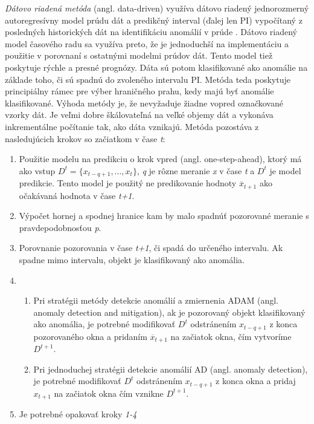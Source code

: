 \textit{Dátovo riadená metóda} (angl. data-driven) využíva dátovo riadený jednorozmerný autoregresívny model prúdu dát a predikčný interval (ďalej len PI) vypočítaný z posledných historických dát na identifikáciu anomálií v prúde \citep{hill2010anomaly}. Dátovo riadený model časového radu sa využíva preto, že je jednoduchší na implementáciu a použitie v porovnaní s ostatnými modelmi prúdov dát. Tento model tiež poskytuje rýchle a presné prognózy. Dáta sú potom klasifikované ako anomálie na základe toho, či sú spadnú do zvoleného intervalu PI. Metóda teda poskytuje principiálny rámec pre výber hraničného prahu, kedy majú byť anomálie klasifikované. Výhoda metódy je, že nevyžaduje žiadne vopred označkované vzorky dát. Je veľmi dobre škálovateľná na veľké objemy dát a vykonáva inkrementálne počítanie tak, ako dáta vznikajú.
Metóda pozostáva z nasledujúcich krokov so začiatkom v čase \textit{t}:
\begin{enumerate}
	\item Použitie modelu na predikciu o krok vpred (angl. one-step-ahead), ktorý má ako vstup $\displaystyle D^t = \{x_{t-q+1}, ..., x_t\}$, \textit{q} je rôzne meranie \textit{x} v čase \textit{t} a $\displaystyle D^t$ je model predikcie. Tento model je použitý ne predikovanie hodnoty $\displaystyle \overline{x}_{t+1}$ ako očakávaná hodnota v čase \textit{t+1}.
	\item Výpočet hornej a spodnej hranice kam by malo spadnúť pozorované meranie s pravdepodobnosťou \textit{p}.
	\item Porovnanie pozorovania v čase \textit{t+1}, či spadá do určeného intervalu. Ak spadne mimo intervalu, objekt je klasifikovaný ako anomália.
	\item 
		\begin{enumerate}
			\item Pri stratégii metódy detekcie anomálií a zmiernenia ADAM (angl. anomaly detection and mitigation), ak je pozorovaný objekt klasifikovaný ako anomália, je potrebné modifikovať $\displaystyle D^t$ odstránením $\displaystyle x_{t-q+1}$ z konca pozorovaného okna a pridaním $\displaystyle \overline{x}_{t+1}$ na začiatok okna, čím vytvoríme $\displaystyle D^{t+1}$.
			\item Pri jednoduchej stratégii detekcie anomálií AD (angl. anomaly detection), je potrebné modifikovať $\displaystyle D^t$  odstránením $\displaystyle x_{t-q+1}$ z konca okna a pridaj $\displaystyle x_{t+1}$ na začiatok okna čím vznikne $\displaystyle D^{t+1}$.
		\end{enumerate}
	\item Je potrebné opakovať kroky \textit{1-4}
\end{enumerate}
